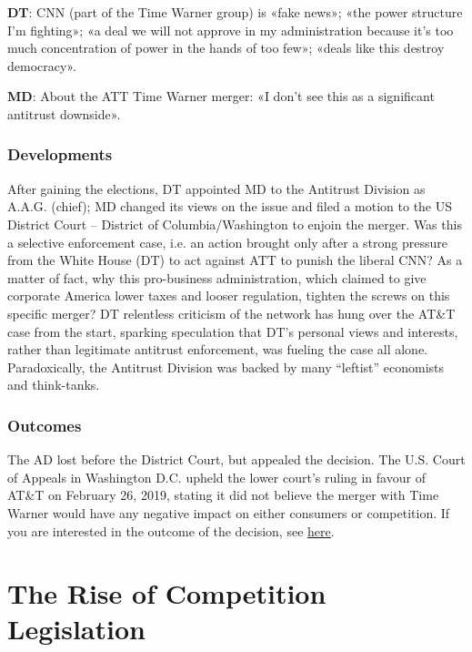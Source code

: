             \textbf{DT}: CNN (part of the Time Warner group) is «fake news»; «the power structure I’m fighting»; «a deal we will not approve in my administration because it’s too much concentration of power in the hands of too few»; «deals like this destroy democracy».
            
            \textbf{MD}: About the ATT Time Warner merger: «I don’t see this as a significant antitrust downside». 
            
        \subsubsection{Developments}

            After gaining the elections, DT appointed MD to the Antitrust Division as A.A.G. (chief);   MD changed its views on the issue and filed a motion to the US District Court – District of Columbia/Washington to enjoin the merger.   Was this a selective enforcement case, i.e. an action brought only after a strong pressure from the White House (DT) to act against ATT to punish the liberal CNN?   As a matter of fact, why this pro-business administration, which claimed to give corporate America lower taxes and looser regulation, tighten the screws on this specific merger?   DT relentless criticism of the network has hung over the AT\&T case from the start, sparking speculation that DT’s personal views and interests, rather than legitimate antitrust enforcement, was fueling the case all alone.   Paradoxically, the Antitrust Division was backed by many “leftist” economists and think-tanks.  

        \subsubsection{Outcomes}

            The AD lost before the District Court, but appealed the decision. The U.S. Court of Appeals in Washington D.C. upheld the lower court’s ruling in favour of AT\&T on February 26, 2019, stating it did not believe the merger with Time Warner would have any negative impact on either consumers or competition. If you are interested in the outcome of the decision, see \href{https://www.cbsnews.com/news/at-t-time-warner-merger-approved-by-u-s-appeals-court-81-billion-takeover-wont-harm-competition/}{here}.

\newpage
\section{The Rise of Competition Legislation}

